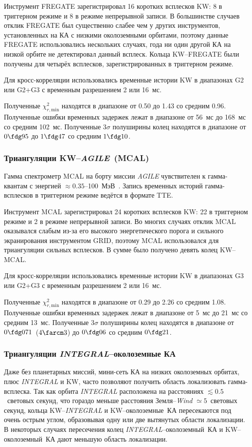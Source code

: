Инструмент FREGATE зарегистрировал 16 коротких всплесков KW: 8 в триггерном режиме 
и 8 в режиме непрерывной записи. В большинстве случаев отклик FREGATE был существенно
слабее чем у других инструментов, установленных на КА с низкими околоземными орбитами, 
поэтому данные FREGATE использовались нескольких случаях, года ни один другой КА на низкой 
орбите не детектировал данный всплеск. Кольца KW--FREGATE были получены для четырёх 
всплесков, зарегистрированных в триггерном режиме.

Для кросс-корреляции использовались временные истории KW в диапазонах G2 
или G2+G3 с временным разрешением 2 или 16~мс.

Полученные $\chi^2_{r,\textrm{min}}$ находятся в диапазоне от 0.50 до 1.43 со средним 0.96. 
Полученные ошибки временных задержек лежат в диапазоне от 56~мс до 168~мс со средним 102~мс. 
Полученные $3\sigma$ полуширины колец находятся в диапазоне от $0\fdg95$ 
до $1\fdg47$ со средним $1\fdg10$.

\subsubsection{Триангуляции KW--\textit{AGILE}~(MCAL)}
Гамма спектрометр MCAL на борту миссии \textit{AGILE} чувствителен к гамма-квантам 
с энергией $\approx 0.35$--100~МэВ~\citep{Tavani_2009AA}. Запись временных историй 
гамма-всплесков в триггерном режиме ведётся в формате TTE.

Инструмент MCAL зарегистрировал 24 коротких всплесков KW: 22 в триггерном 
режиме и 2 в режиме непрерывной записи. Во многих случаях отклик MCAL оказывался 
слабым из-за его высокого энергетического порога и сильного экранирования инструментом GRID, 
поэтому MCAL использовался для триангуляции сильных всплесков. В сумме было получено девять колец
KW--MCAL.

Для кросс-корреляции использовались временные истории KW в диапазонах G3 
или G2+G3 с временным разрешением 2 или 16~мс.

Полученные $\chi^2_{r,\textrm{min}}$ находятся в диапазоне от 0.29 до 2.26 со 
средним 1.08. Полученные ошибки временных задержек лежат в диапазоне от 5~мс 
до 21~мс со средним 13~мс. Полученные $3\sigma$ полуширины колец находятся 
в диапазоне от $0\fdg071$~($4\farcm3$) до $0\fdg06$ 
со средним $0\fdg21$.

\subsubsection{Триангуляции \textit{INTEGRAL}--околоземные КА}
Даже без планетарных миссий, мини-сеть КА на низких околоземных орбитах, 
плюс \textit{INTEGRAL} и KW, часто позволяют получить область локализовать 
гамма-всплеска. Так как орбита \textit{INTEGRAL} расположена на расстояниях 
$\lesssim 0.5$~световых секунд, что гораздо меньше расстояния Земля--\textit{Wind} 
$\simeq 5$~световых секунд, кольца KW--\textit{INTEGRAL} и KW--околоземные~КА 
пересекаются под очень острым углом, образовывая одну или две вытянутых области локализации. 
В некоторых случаях пересечения колец \textit{INTEGRAL}--околоземный~КА и 
KW--околоземный~КА дают меньшую область локализации.


